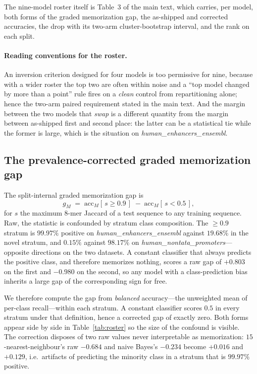 \documentclass[11pt,a4paper]{article}
\begin{document}
The nine-model roster itself is Table~3 of the main text, which carries, per model, both forms of
the graded memorization gap, the as-shipped and corrected accuracies, the drop with its two-arm
cluster-bootstrap interval, and the rank on each split.

\paragraph{Reading conventions for the roster.} An inversion criterion designed for four models is
too permissive for nine, because with a wider roster the top two are often within noise and a
``top model changed by more than a point'' rule fires on a \emph{clean} control from repartitioning
alone; hence the two-arm paired requirement stated in the main text. And the margin between the two
models that \emph{swap} is a different quantity from the margin between as-shipped first and second
place: the latter can be a statistical tie while the former is large, which is the situation on
\textit{human\_enhancers\_ensembl}.

\subsection{The prevalence-corrected graded memorization gap}\label{sec:s-gap}
The split-internal graded memorization gap is
\begin{equation}
g_M \;=\; \mathrm{acc}_M[\,s\ge0.9\,]\;-\;\mathrm{acc}_M[\,s<0.5\,],
\end{equation}
for $s$ the maximum $8$-mer Jaccard of a test sequence to any training sequence. Raw, the statistic
is confounded by stratum class composition. The $\ge0.9$ stratum is $99.97\%$ positive on
\textit{human\_enhancers\_ensembl} against $19.68\%$ in the novel stratum, and $0.15\%$ against
$98.17\%$ on \textit{human\_nontata\_promoters}---opposite directions on the two datasets. A
constant classifier that always predicts the positive class, and therefore memorizes nothing,
scores a raw gap of $+0.803$ on the first and $-0.980$ on the second, so any model with a
class-prediction bias inherits a large gap of the corresponding sign for free.

We therefore compute the gap from \emph{balanced} accuracy---the unweighted mean of per-class
recall---within each stratum. A constant classifier scores $0.5$ in every stratum under that
definition, hence a corrected gap of exactly zero. Both forms appear side by side in
Table~\ref{tab:roster} so the size of the confound is visible. The correction disposes of two raw
values never interpretable as memorization: $15$-nearest-neighbour's raw $-0.684$ and naive Bayes's
$-0.234$ become $+0.016$ and $+0.129$, i.e.\ artifacts of predicting the minority class in a
stratum that is $99.97\%$ positive.
\end{document}
